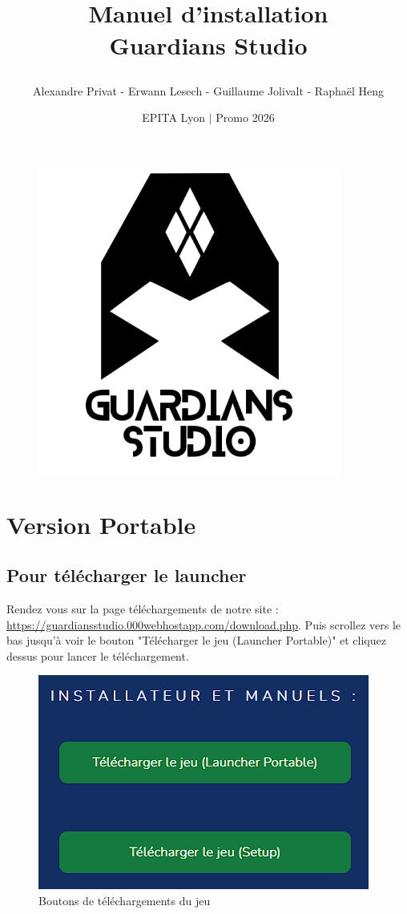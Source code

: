 \documentclass[a4paper, 12pt]{article}
\title{
	\hrulefill
	\\
	Manuel d'installation
	\\
	\textbf{Guardians Studio} \\
	\hrulefill

}
\author{Alexandre Privat - Erwann Lesech - Guillaume Jolivalt - Raphaël Heng}
\date{EPITA Lyon $|$ Promo 2026}
\begin{document}
	\maketitle
	\begin{figure}[ht]
		\centering
		\includegraphics[width=10cm, height=10cm]{images/logo.png}
	\end{figure}
	\clearpage
	\tableofcontents
	
	\clearpage
	
	\section{Version Portable}
	\subsection{Pour télécharger le launcher}
	Rendez vous sur la page téléchargements de notre site :
	\url{https://guardiansstudio.000webhostapp.com/download.php}.
	Puis scrollez vers le bas jusqu'à voir le bouton "Télécharger le jeu (Launcher Portable)" et cliquez dessus pour lancer le téléchargement.
	
	\begin{figure}[ht]
		\centering
		\includegraphics[scale=0.6]{images/download_launcher.png}
		\caption{Boutons de téléchargements du jeu}
	\end{figure}
	
\end{document}
